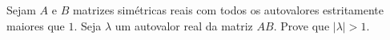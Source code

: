 Sejam \(A\) e \(B\) matrizes simétricas reais com todos os autovalores estritamente maiores que \(1\). Seja \(\lambda\) um autovalor real da matriz \(AB\). Prove que \(|\lambda| > 1\).
